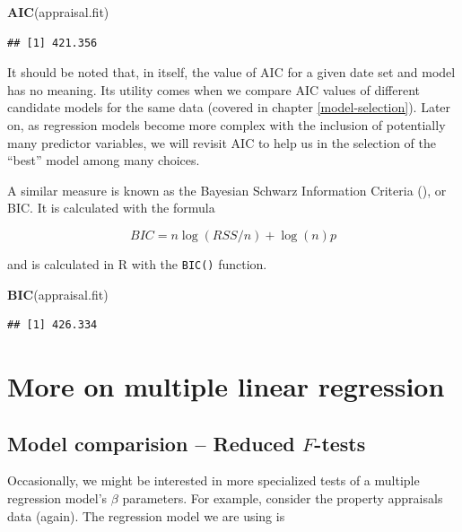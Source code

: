 \documentclass[
]{book}
\newenvironment{Shaded}{\begin{snugshade}}{\end{snugshade}}
\newcommand{\FunctionTok}[1]{\textcolor[rgb]{0.13,0.29,0.53}{\textbf{#1}}}
\newcommand{\NormalTok}[1]{#1}
\begin{document}
\begin{Shaded}
\begin{Highlighting}[]
\FunctionTok{AIC}\NormalTok{(appraisal.fit)}
\end{Highlighting}
\end{Shaded}

\begin{verbatim}
## [1] 421.356
\end{verbatim}

It should be noted that, in itself, the value of AIC for a given date set and model has no meaning.
Its utility comes when we compare AIC values of different candidate models for the same data (covered in chapter \ref{model-selection}).
Later on, as regression models become more complex with the inclusion of potentially many predictor variables, we will revisit AIC to help us in the selection of the ``best'' model among many choices.

A similar measure is known as the Bayesian Schwarz Information Criteria (\citet{Schwarz1978}), or BIC. It is calculated with the formula

\[BIC = n\log(RSS/n) + \log(n)p\]

and is calculated in R with the \texttt{BIC()} function.

\begin{Shaded}
\begin{Highlighting}[]
\FunctionTok{BIC}\NormalTok{(appraisal.fit)}
\end{Highlighting}
\end{Shaded}

\begin{verbatim}
## [1] 426.334
\end{verbatim}

\hypertarget{more-on-multiple-linear-regression}{%
\chapter{More on multiple linear regression}\label{more-on-multiple-linear-regression}}

\hypertarget{model-comparision-reduced-f-tests}{%
\section{\texorpdfstring{Model comparision -- Reduced \(F\)-tests}{Model comparision -- Reduced F-tests}}\label{model-comparision-reduced-f-tests}}

Occasionally, we might be interested in more specialized tests of a multiple regression model's \(\beta\) parameters. For example, consider the property appraisals data (again). The regression model we are using is
\end{document}
